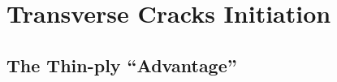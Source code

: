 \documentclass[first,firstsupp,lastsupp,last,hyperref,table]{ETHclass}
\begin{document}



\section{Transverse Cracks Initiation}

\subsection{The Thin-ply ``Advantage''}
\end{document}
